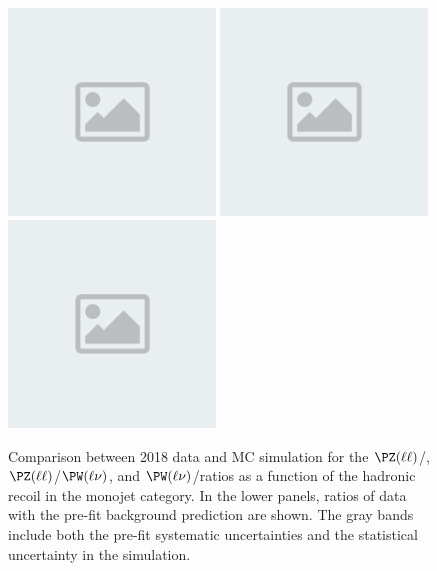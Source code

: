 \begin{figure}[htbp]
\centering
\includegraphics[width=0.49\textwidth]{placeholder.png}
\includegraphics[width=0.49\textwidth]{placeholder.png}
\\
\includegraphics[width=0.49\textwidth]{placeholder.png}
\caption{Comparison between 2018 data and MC simulation for the  $\PZ(\ell\ell)$/\phojets,
$\PZ(\ell\ell)$/$\PW(\ell\nu)$, and $\PW(\ell\nu)$/\phojets ratios as a function
of the hadronic recoil in the monojet category.
In the lower panels, ratios of data with the pre-fit background prediction are shown.
The gray bands include both the pre-fit systematic uncertainties and the statistical uncertainty in the simulation.}
\label{fig:Ratio_2018}
\end{figure}

